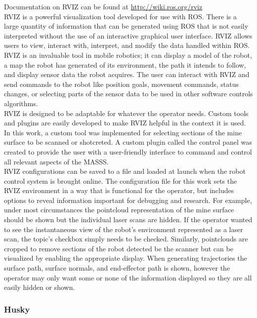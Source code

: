 Documentation on RVIZ can be found at \url{http://wiki.ros.org/rviz}\\

RVIZ is a powerful visualization tool developed for use with ROS. There is a large quantity of information that can be generated using ROS that is not easily interpreted without the use of an interactive graphical user interface. RVIZ allows users to view, interact with, interpret, and modify the data handled within ROS. RVIZ is an invaluable tool in mobile robotics; it can display a model of the robot, a map the robot has generated of its environment, the path it intends to follow, and display sensor data the robot acquires. The user can interact with RVIZ and send commands to the robot like position goals, movement commands, status changes, or selecting parts of the sensor data to be used in other software controls algorithms.\\

RVIZ is designed to be adaptable for whatever the operator needs. Custom tools and plugins are easily developed to make RVIZ helpful in the context it is used. In this work, a custom tool was implemented for selecting sections of the mine surface to be scanned or shotcreted. A custom plugin called the control panel was created to provide the user with a user-friendly interface to command and control all relevant aspects of the MASSS.\\

RVIZ configurations can be saved to a file and loaded at launch when the robot control system is brought online. The configuration file for this work sets the RVIZ environment in a way that is functional for the operator, but includes options to reveal information important for debugging and research. For example, under most circumstances the pointcloud representation of the mine surface should be shown but the individual laser scans are hidden. If the operator wanted to see the instantaneous view of the robot's environment represented as a laser scan, the topic's checkbox simply needs to be checked. Similarly, pointclouds are cropped to remove sections of the robot detected be the scanner but can be visualized by enabling the appropriate display. When generating trajectories the surface path, surface normals, and end-effector path is shown, however the operator may only want some or none of the information displayed so they are all easily hidden or shown.\\

\subsubsection{Husky}

